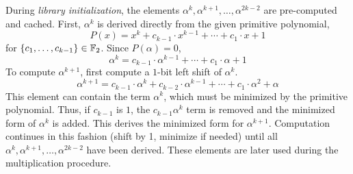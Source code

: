 During {\it library initialization}, the elements 
$\alpha^k,\alpha^{k+1},\dots,\alpha^{2k-2}$ are pre-computed and cached. First,
$\alpha^k$ is derived directly from the given primitive polynomial, 
\begin{equation}
P(x)=x^k+c_{k-1}\cdot x^{k-1}+\cdots+c_1\cdot x+1
\end{equation}
for $\{c_1,\dots,c_{k-1}\}\in{\mathbb{F}}_2$. Since $P(\alpha)=0$,
\begin{equation}
\alpha^k=c_{k-1}\cdot\alpha^{k-1}+\cdots+c_1\cdot\alpha+1
\end{equation}
To compute $\alpha^{k+1}$, first compute a $1$-bit left shift of
$\alpha^k$.
\begin{equation}
\alpha^{k+1}=c_{k-1}\cdot\alpha^k+c_{k-2}\cdot\alpha^{k-1}+\cdots+c_1\cdot\alpha^2+\alpha
\end{equation}
This element can contain the term $\alpha^k$, which must be minimized by the primitive
polynomial.
Thus, if $c_{k-1}$ is $1$, the $c_{k-1}\alpha^k$ term is removed and the minimized 
form of $\alpha^k$ is added. This derives the minimized form for $\alpha^{k+1}$. 
Computation continues in this fashion (shift by 1, minimize if needed) until all
$\alpha^k,\alpha^{k+1},\dots,\alpha^{2k-2}$ have been derived.
These elements are later used during the multiplication procedure.

